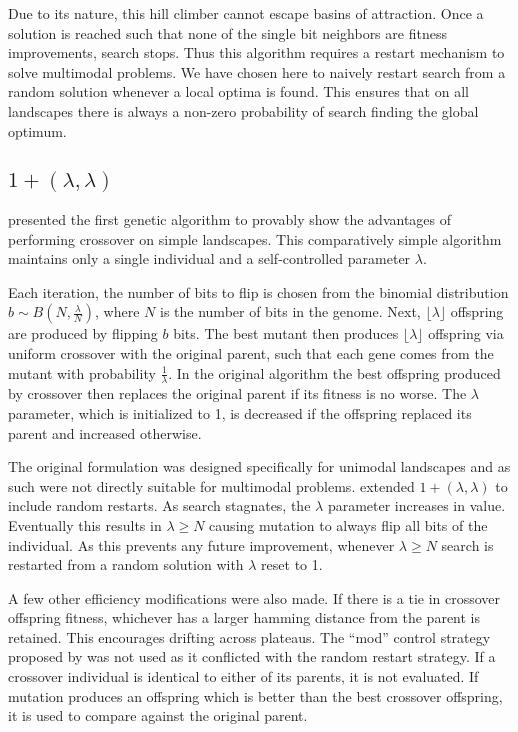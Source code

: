 \documentclass[twoside]{article}
\begin{document}
Due to its nature, this hill climber cannot escape basins of attraction. Once a solution is reached
such that none of the single bit neighbors are fitness improvements, search stops. Thus
this algorithm requires a restart mechanism to solve multimodal problems. We have
chosen here to naively restart search from a random solution whenever a local optima is found. This
ensures that on all landscapes there is always a non-zero probability of search finding the global optimum.

\subsection{$1+(\lambda, \lambda)$}
\cite{doerr:2013:lambdalambda} presented the first genetic algorithm to provably show
the advantages of performing crossover on simple landscapes. This comparatively simple
algorithm maintains only a single individual and a self-controlled parameter $\lambda$.

Each iteration, the number of bits to flip is chosen from the binomial distribution $b\sim B(N, \frac{\lambda}{N})$,
where $N$ is the number of bits in the genome.
Next, $\lfloor\lambda\rfloor$ offspring are produced by flipping $b$ bits. The
best mutant then produces $\lfloor\lambda\rfloor$ offspring via uniform crossover with the original parent, such that each gene comes from the
mutant with probability $\frac{1}{\lambda}$. In the original algorithm the best
offspring produced by crossover then replaces the original parent if its fitness is no worse.
The $\lambda$ parameter, which is initialized to 1, is decreased if the offspring replaced
its parent and increased otherwise.

The original formulation was designed specifically for unimodal landscapes and as such were
not directly suitable for multimodal problems. \cite{goldman:2014:p3} extended $1+(\lambda, \lambda)$
to include random restarts. As search stagnates, the $\lambda$ parameter increases in value. Eventually
this results in $\lambda \ge N$ causing mutation to always flip all bits of the individual.
As this prevents any future improvement, whenever $\lambda \ge N$ search is restarted from a random solution with $\lambda$
reset to 1.

A few other efficiency modifications were also made. If there is a tie in crossover offspring fitness,
whichever has a larger hamming distance from the parent is retained. This encourages drifting across plateaus.
The ``mod'' control strategy proposed by \cite{doerr:2013:lambdalambda} was not used as it conflicted with
the random restart strategy.
If a crossover individual is identical to either of its parents, it is not evaluated.
If mutation produces an offspring which is better than the best crossover offspring, it is used to compare
against the original parent.
\end{document}
